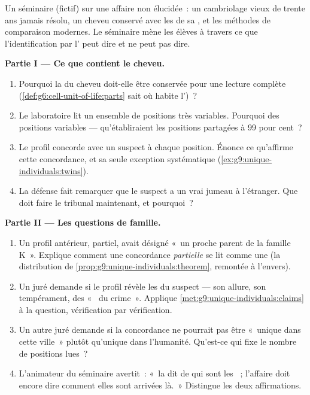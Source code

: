 \begin{problem}\label{pb:g9:unique-individuals:1}
Un séminaire (fictif) sur une affaire non élucidée~: un
cambriolage vieux de trente ans jamais résolu, un cheveu
conservé avec les  de sa , et les méthodes de
comparaison modernes. Le séminaire mène les élèves à travers
ce que l'identification par l' peut dire et ne peut pas
dire.

\medskip\noindent\textbf{Partie I --- Ce que contient le
cheveu.}
\begin{enumerate}
  \item Pourquoi la \emph{} du cheveu doit-elle être
        conservée pour une lecture complète
        (\cref{def:g6:cell-unit-of-life:parts} sait où
        habite l')~?
  \item Le laboratoire lit un ensemble de positions très
        variables. Pourquoi des positions variables ---
        qu'établiraient les positions partagées à 99 pour
        cent~?
  \item Le profil concorde avec un suspect à chaque
        position. Énonce ce qu'affirme cette concordance,
        et sa seule exception systématique
        (\cref{ex:g9:unique-individuals:twins}).
  \item La défense fait remarquer que le suspect a un vrai
        jumeau à l'étranger. Que doit faire le tribunal
        maintenant, et pourquoi~?
\end{enumerate}

\medskip\noindent\textbf{Partie II --- Les questions de
famille.}
\begin{enumerate}[resume]
  \item Un profil antérieur, partiel, avait désigné «~un
        proche parent de la famille K~». Explique comment
        une concordance \emph{partielle} se lit comme une
         (la distribution de
        \cref{prop:g9:unique-individuals:theorem}, remontée
        à l'envers).
  \item Un juré demande si le profil révèle les 
        du suspect --- son allure, son tempérament, des
        «~ du crime~». Applique
        \cref{met:g9:unique-individuals:claims} à la
        question, vérification par vérification.
  \item Un autre juré demande si la concordance ne pourrait
        pas être «~unique dans cette ville~» plutôt
        qu'unique dans l'humanité. Qu'est-ce qui fixe le
        nombre de positions lues~?
  \item L'animateur du séminaire avertit~: «~la 
        dit de qui sont les ~; l'affaire doit
        encore dire comment elles sont arrivées là.~»
        Distingue les deux affirmations.
\end{enumerate}


\end{problem}
